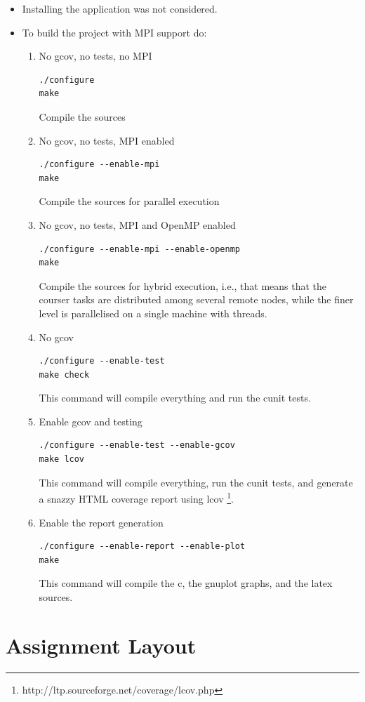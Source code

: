 \documentclass[12pt,a4paper]{report}
\begin{document}
\begin{itemize}
\item Installing the application was not considered.
\item To build the project with MPI support do:
  \begin{enumerate}
  \item No gcov, no tests, no MPI
\begin{verbatim}
./configure
make
\end{verbatim}
    Compile the sources
  \item No gcov, no tests, MPI enabled
\begin{verbatim}
./configure --enable-mpi
make
\end{verbatim}
    Compile the sources for parallel execution
  \item No gcov, no tests, MPI and OpenMP enabled
\begin{verbatim}
./configure --enable-mpi --enable-openmp
make
\end{verbatim}
    Compile the sources for hybrid execution, i.e., that means that
    the courser tasks are distributed among several remote nodes,
    while the finer level is parallelised on a single machine with
    threads.
  \item No gcov
\begin{verbatim}
./configure --enable-test
make check
\end{verbatim}
    This command will compile everything and run the cunit tests.
  \item Enable gcov and testing
\begin{verbatim}
./configure --enable-test --enable-gcov
make lcov
\end{verbatim}
    This command will compile everything, run the cunit tests, and
    generate a snazzy HTML coverage report using lcov
    \footnote{http://ltp.sourceforge.net/coverage/lcov.php}.
  \item Enable the report generation
\begin{verbatim}
./configure --enable-report --enable-plot
make
\end{verbatim}
    This command will compile the c, the gnuplot graphs, and the latex
    sources.
  \end{enumerate}
\end{itemize}

\section{Assignment Layout}
\label{sec:assignment-layout}
\end{document}
